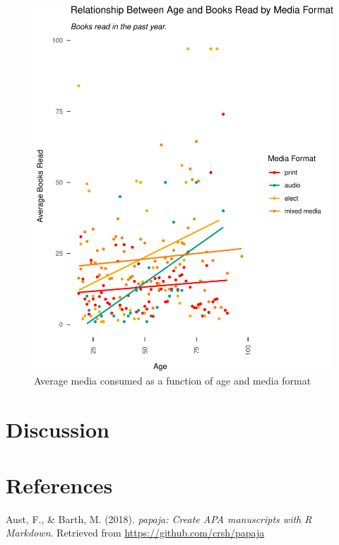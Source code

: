 \documentclass[man, fleqn, noextraspace]{apa6}
\theoremstyle{definition}
\theoremstyle{definition}
\theoremstyle{definition}
\theoremstyle{remark}
\begin{document}
\begin{figure}
\centering
\includegraphics{final_manuscript_files/figure-latex/fig4-1.pdf}
\caption{\label{fig:fig4}Average media consumed as a function of age and
media format}
\end{figure}

\section{Discussion}\label{discussion}

\newpage

\section{References}\label{references}

\begingroup
\setlength{\parindent}{-0.5in} \setlength{\leftskip}{0.5in}

\hypertarget{refs}{}
\hypertarget{ref-R-papaja}{}
Aust, F., \& Barth, M. (2018). \emph{papaja: Create APA manuscripts with
R Markdown}. Retrieved from \url{https://github.com/crsh/papaja}
\end{document}
